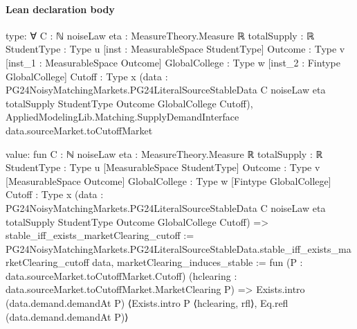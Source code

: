\documentclass[10pt]{article}
\begin{document}
\paragraph{Lean declaration body}
\begin{ReviewVerbatim}
type:
∀ {C : ℕ} {noiseLaw eta : MeasureTheory.Measure ℝ} {totalSupply : ℝ} {StudentType : Type u}
  [inst : MeasurableSpace StudentType] {Outcome : Type v} [inst_1 : MeasurableSpace Outcome] {GlobalCollege : Type w}
  [inst_2 : Fintype GlobalCollege] {Cutoff : Type x}
  (data :
    PG24NoisyMatchingMarkets.PG24LiteralSourceStableData C noiseLaw eta totalSupply StudentType Outcome GlobalCollege
      Cutoff),
  AppliedModelingLib.Matching.SupplyDemandInterface data.sourceMarket.toCutoffMarket

value:
fun {C : ℕ} {noiseLaw eta : MeasureTheory.Measure ℝ} {totalSupply : ℝ} {StudentType : Type u}
    [MeasurableSpace StudentType] {Outcome : Type v} [MeasurableSpace Outcome] {GlobalCollege : Type w}
    [Fintype GlobalCollege] {Cutoff : Type x}
    (data :
      PG24NoisyMatchingMarkets.PG24LiteralSourceStableData C noiseLaw eta totalSupply StudentType Outcome GlobalCollege
        Cutoff) =>
  {
    stable_iff_exists_marketClearing_cutoff :=
      PG24NoisyMatchingMarkets.PG24LiteralSourceStableData.stable_iff_exists_marketClearing_cutoff data,
    marketClearing_induces_stable :=
      fun (P : data.sourceMarket.toCutoffMarket.Cutoff)
        (hclearing : data.sourceMarket.toCutoffMarket.MarketClearing P) =>
      Exists.intro (data.demand.demandAt P) ⟨Exists.intro P ⟨hclearing, rfl⟩, Eq.refl (data.demand.demandAt P)⟩ }
\end{ReviewVerbatim}
\end{document}
